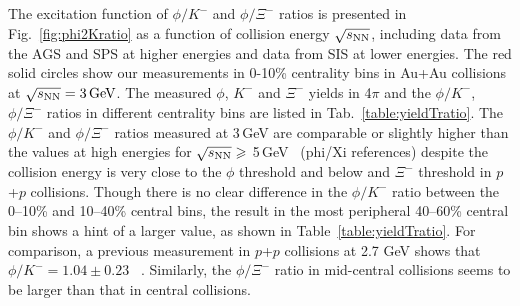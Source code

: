 \documentclass[%
 reprint,	
showpacs,
 amsmath,amssymb,
 aps,
 prc,
]{revtex4-1}
\begin{document}
The excitation function of $\phi/K^-$ and $\phi/\Xi^-$ ratios is presented in Fig.~\ref{fig:phi2Kratio} as a function of collision energy $\sqrt{s_{\rm NN}}$, including data from the AGS and SPS at higher energies and data from SIS at lower energies. The red solid circles show our measurements in 0-10\% centrality bins in Au+Au collisions at ${\sqrt{s_{\rm NN}} = \rm{3\,GeV}}$. The measured $\phi$, $K^-$ and $\Xi^-$ yields in 4$\pi$ and the $\phi/K^-$, $\phi/\Xi^-$ ratios in different centrality bins are listed in Tab.~\ref{table:yieldTratio}. The $\phi/K^-$ and $\phi/\Xi^-$ ratios measured at 3\,GeV are %
comparable or slightly higher than the values at high energies for $\sqrt{s_{\rm NN}}\geqslant$ 5\,GeV~\cite{NA49_phi,NA49_piK,NA49_piK2,E917_phi,ALICE_phi_2p7TeV,STAR_phi_64a200GeV} (phi/Xi references) despite the collision energy is very close to the $\phi$ threshold and below and $\Xi^-$ threshold in $p$+$p$ collisions. %
Though there is no clear difference in the $\phi/K^-$ ratio between the 0--10\% and 10--40\% central bins, the result in the most peripheral 40--60\% central bin shows a hint of a larger value, as shown in Table~\ref{table:yieldTratio}. For comparison, a previous measurement in $p$+$p$ collisions at 2.7 GeV shows that $\phi/K^- = 1.04\pm0.23$ ~\cite{ANKE_phi}. Similarly, the $\phi/\Xi^-$ ratio in mid-central collisions seems to be larger than that in central collisions.
\end{document}
